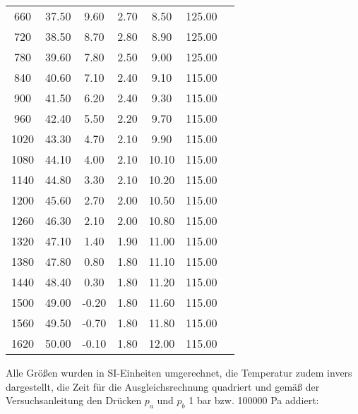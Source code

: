 \begin{table}
\begin{tabular}{c c c c c c c}
     660 &    37.50 &      9.60 &       2.70 &       8.50 & 125.00 \\
     720 &    38.50 &      8.70 &       2.80 &       8.90 & 125.00 \\
     780 &    39.60 &      7.80 &       2.50 &       9.00 & 125.00 \\
     840 &    40.60 &      7.10 &       2.40 &       9.10 & 115.00 \\
     900 &    41.50 &      6.20 &       2.40 &       9.30 & 115.00 \\
     960 &    42.40 &      5.50 &       2.20 &       9.70 & 115.00 \\
    1020 &    43.30 &      4.70 &       2.10 &       9.90 & 115.00 \\
    1080 &    44.10 &      4.00 &       2.10 &      10.10 & 115.00 \\
    1140 &    44.80 &      3.30 &       2.10 &      10.20 & 115.00 \\
    1200 &    45.60 &      2.70 &       2.00 &      10.50 & 115.00 \\
    1260 &    46.30 &      2.10 &       2.00 &      10.80 & 115.00 \\
    1320 &    47.10 &      1.40 &       1.90 &      11.00 & 115.00 \\
    1380 &    47.80 &      0.80 &       1.80 &      11.10 & 115.00 \\
    1440 &    48.40 &      0.30 &       1.80 &      11.20 & 115.00 \\
    1500 &    49.00 &     -0.20 &       1.80 &      11.60 & 115.00 \\
    1560 &    49.50 &     -0.70 &       1.80 &      11.80 & 115.00 \\
    1620 &    50.00 &     -0.10 &       1.80 &      12.00 & 115.00 \\
    \bottomrule
  \end{tabular}
\end{table}

\newpage
Alle Größen wurden in SI-Einheiten umgerechnet, die Temperatur zudem invers dargestellt,
die Zeit für die Ausgleichsrechnung quadriert und gemäß der Versuchsanleitung \cite{v206} den Drücken $\textit{p}_\textit{a}$ und $\textit{p}_\textit{b}$ 1 bar bzw. 100000 Pa addiert:

